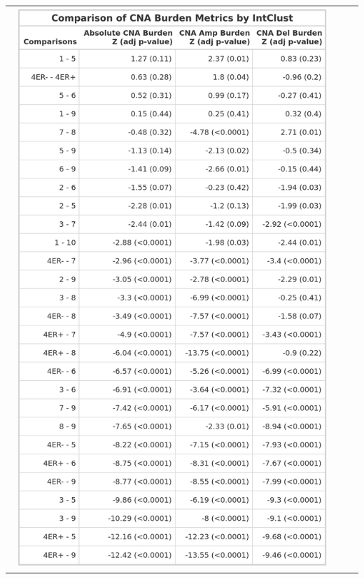 \begin{table}[!ht]
\begin{minipage}[c]{0.45\textwidth}
\end{minipage}
\hspace{0.8cm}
\begin{minipage}[c]{0.45\textwidth}
\centering
\begin{tabular}{ccc}
\includegraphics[width=0.96\textwidth]{../tables/Chapter_2/Global_CNA_Burden_Metric_IntClust_Comparisons_2.png}
\end{tabular}
\end{minipage}
\label{tab:DT_Burden_2}
\end{table}

